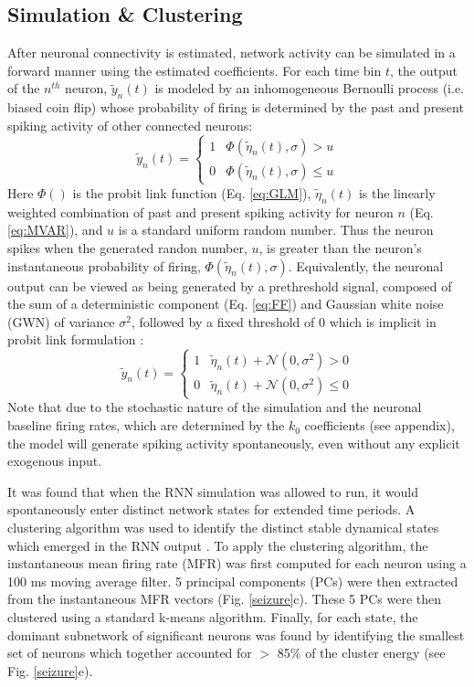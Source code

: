\documentclass[11pt,a4paper,final]{article}
\begin{document}
\subsection{Simulation \& Clustering}
After neuronal connectivity is estimated, network activity can be simulated in a forward manner using the estimated coefficients. 
For each time bin $t$, the output of the $n^{th}$ neuron, $\tilde{y}_n(t)$ is modeled by an inhomogeneous Bernoulli process (i.e. biased coin flip) whose probability of firing is determined by the past and present spiking activity of other connected neurons: 
\begin{equation}
\tilde{y}_n(t) =
\begin{cases}
1   & \Phi(\tilde{\eta}_n(t),\sigma) > u        \\
0   & \Phi(\tilde{\eta}_n(t),\sigma) \leq u
\end{cases}
\label{eq:simul}
\end{equation}
Here $\Phi()$ is the probit link function (Eq. \ref{eq:GLM}), $\tilde{\eta}_n(t)$ is the linearly weighted combination of past and present spiking activity for neuron $n$ (Eq. \ref{eq:MVAR}), and $u$ is a standard uniform random number.
Thus the neuron spikes when the generated randon number, $u$, is greater than the neuron's instantaneous probability of firing, $\Phi(\tilde{\eta}_n(t),\sigma)$.
Equivalently, the neuronal output can be viewed as being generated by a prethreshold signal, composed of the sum of a deterministic component (Eq. \ref{eq:FF}) and Gaussian white noise (GWN) of variance $\sigma^2$, followed by a fixed threshold of 0 which is implicit in probit link formulation \citep{berger12}:
\begin{equation}
\tilde{y}_n(t) =
\begin{cases}
1   & \tilde{\eta}_n(t) + \mathcal{N}(0,\sigma^2) > 0        \\
0   & \tilde{\eta}_n(t) + \mathcal{N}(0,\sigma^2) \leq 0
\end{cases}
\label{eq:simul2}
\end{equation}
Note that due to the stochastic nature of the simulation and the neuronal baseline firing rates, which are determined by the $k_0$ coefficients (see appendix), the model will generate spiking activity spontaneously, even without any explicit exogenous input. 

It was found that when the RNN simulation was allowed to run, it would spontaneously enter distinct network states for extended time periods.
A clustering algorithm was used to identify the distinct stable dynamical states which emerged in the RNN output \citep{sasaki07,santaniello14}.
To apply the clustering algorithm, the instantaneous mean firing rate (MFR) was first computed for each neuron using a 100 ms moving average filter.
5 principal components (PCs) were then extracted from the \nn{} instantaneous MFR vectors (Fig. \ref{seizure}c).
These 5 PCs were then clustered using a standard k-means algorithm.
Finally, for each state, the dominant subnetwork of significant neurons was found by identifying the smallest set of neurons which together accounted for $>$ 85\% of the cluster energy (see Fig. \ref{seizure}e).
\end{document}
